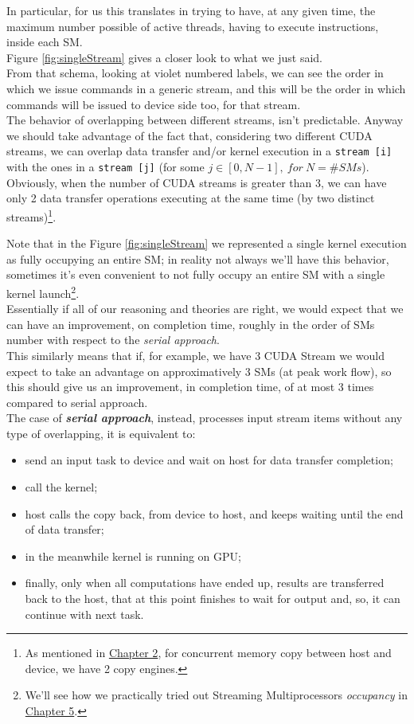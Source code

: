 	In particular, for us this translates in trying to have, at any given time, the maximum number possible of active threads, having to execute instructions, inside each SM.\\
	Figure \ref{fig:singleStream} gives a closer look to what we just said.\\
	
	From that schema, looking at violet numbered labels, we can see the order in which we issue commands in a generic stream, and this will be the order in which commands will be issued to device side too, for that stream. \\
	The behavior of overlapping between different streams, isn't predictable\cite{cudaguide}. Anyway we should take advantage of the fact that, considering two different CUDA streams, we can overlap data transfer and/or kernel execution in a \texttt{stream [i]} with the ones in a \texttt{stream [j]} (for some \(j\in[0,N-1], \: for \: N =\# SMs\)). Obviously, when the number of CUDA streams is greater than 3, we can have only 2 data transfer operations executing at the same time (by two distinct streams)\footnote{As mentioned in \hyperref[chap:tools]{Chapter 2}, for concurrent memory copy between host and device, we have 2 copy engines.}.
	
	Note that in the Figure \ref{fig:singleStream} we represented a single kernel execution as fully occupying an entire SM; in reality not always we'll have this behavior, sometimes it's even convenient to not fully occupy an entire SM with a single kernel launch\footnote{We'll see how we practically tried out Streaming Multiprocessors \textit{occupancy} in  \hyperref[chap:experim]{Chapter 5}.}. \\
	
	Essentially if all of our reasoning and theories are right, we would expect that we can have an improvement, on completion time, roughly in the order of SMs number with respect to the \textit{serial approach}. \\
	This similarly means that if, for example, we have 3 CUDA Stream we would expect to take an advantage on approximatively 3 SMs (at peak work flow), so this should give us an improvement, in completion time, of at most 3 times compared to serial approach.\\
	The case of \textit{\textbf{serial approach}}, instead, processes input stream items without any type of overlapping, it is equivalent to:
	\begin{itemize}
		\item send an input task to device and wait on host for data transfer completion;
		\item call the kernel;
		\item host calls the copy back, from device to host, and keeps waiting until the end of data transfer;
		\item in the meanwhile kernel is running on GPU; 
		\item finally, only when all computations have ended up, results are transferred back to the host, that at this point finishes to wait for output and, so, it can continue with next task.
	\end{itemize} 
	

